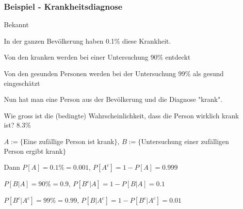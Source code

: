 \subsubsection{Beispiel - Krankheitsdiagnose}
\enumstart
	\item Bekannt
	\enumstart
		\item In der ganzen Bevölkerung haben 0.1\% diese Krankheit.
		\item Von den kranken werden bei einer Untersuchung 90\% entdeckt
		\item Von den gesunden Personen werden bei der Untersuchung 99\% als gesund eingeschätzt
	\enumend
	\item Nun hat man eine Person aus der Bevölkerung und die Diagnose "krank".
	\item Wie gross ist die (bedingte) Wahrscheinlichkeit, dass die Person wirklich krank ist? 8.3\%
	\item $A := \{$Eine zufällige Person ist krank$\}$, $B := \{$Untersuchung einer zufälligen Person ergibt krank$\}$
	\item Dann $P[A] = 0.1\% = 0.001$, $P[A^c] = 1 - P[A] = 0.999$
	\item $P[B | A] = 90\% = 0.9$, $P[B^c | A] = 1 - P[B | A] = 0.1$
	\item $P[B^c | A^c] = 99\% = 0.99$, $P[B | A^c] = 1 - P[B^c | A^c] = 0.01$
\enumend
